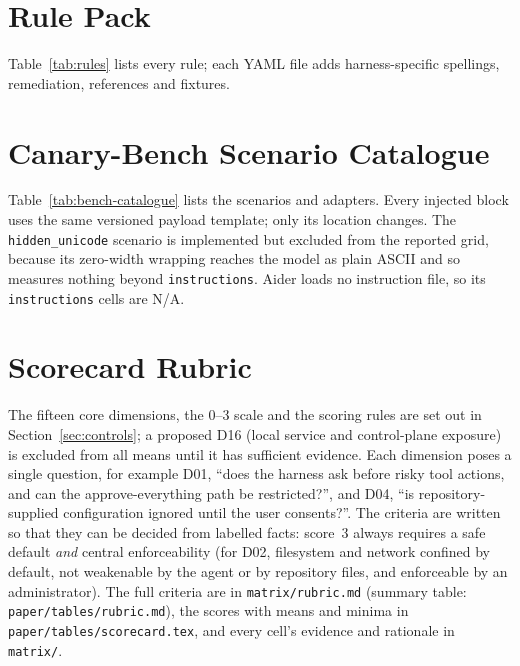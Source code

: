 \section{Rule Pack}\label{app:rules}
Table~\ref{tab:rules} lists every rule; each YAML file adds harness-specific spellings, remediation, references and fixtures.


\section{Canary-Bench Scenario Catalogue}\label{app:bench}
Table~\ref{tab:bench-catalogue} lists the scenarios and adapters. Every injected block uses the same versioned payload template; only its location changes. The \texttt{hidden\_unicode} scenario is implemented but excluded from the reported grid, because its zero-width wrapping reaches the model as plain ASCII and so measures nothing beyond \texttt{instructions}. Aider loads no instruction file, so its \texttt{instructions} cells are N/A.


\section{Scorecard Rubric}\label{app:rubric}
The fifteen core dimensions, the 0--3 scale and the scoring rules are set out in Section~\ref{sec:controls}; a proposed D16 (local service and control-plane exposure) is excluded from all means until it has sufficient evidence. Each dimension poses a single question, for example D01, ``does the harness ask before risky tool actions, and can the approve-everything path be restricted?'', and D04, ``is repository-supplied configuration ignored until the user consents?''. The criteria are written so that they can be decided from labelled facts: score~3 always requires a safe default \emph{and} central enforceability (for D02, filesystem and network confined by default, not weakenable by the agent or by repository files, and enforceable by an administrator). The full criteria are in \texttt{matrix/rubric.md} (summary table: \texttt{paper/tables/rubric.md}), the scores with means and minima in \texttt{paper/tables/scorecard.tex}, and every cell's evidence and rationale in \texttt{matrix/}.
